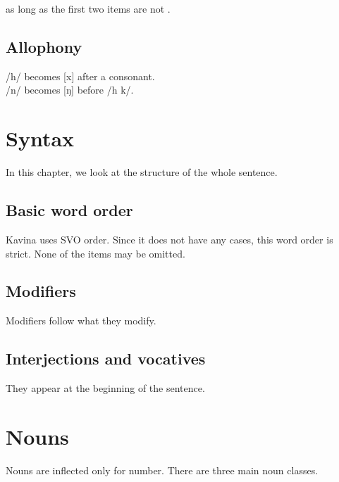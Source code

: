 \documentclass{book}
\begin{document}
as long as the first two items are not .

\section{Allophony}

/h/ becomes [x] after a consonant. \\
/n/ becomes [ŋ] before /h k/.

\chapter{Syntax}

In this chapter, we look at the structure of the whole sentence.

\section{Basic word order}

Kavina uses SVO order. Since it does not have any cases, this word order is strict. None of the items may be omitted.

\section{Modifiers}

Modifiers follow what they modify.

\section{Interjections and vocatives}

They appear at the beginning of the sentence.

\chapter{Nouns}

Nouns are inflected only for number. There are three main noun classes.

\newcommand{\decltab}[4]{
    \begin{table}[htbp]
        \centering
        \caption{Declension of \ortho{#3#1} \emph{#4}}
        \begin{tabu} to \textwidth {|p{3cm}|p{2cm}|X|}
            \hline
            Singular & -#1 & #3#1 \\ \hline
            Plural & -#2 & #3#2 \\ \hline
        \end{tabu}
    \end{table}
}
\end{document}
